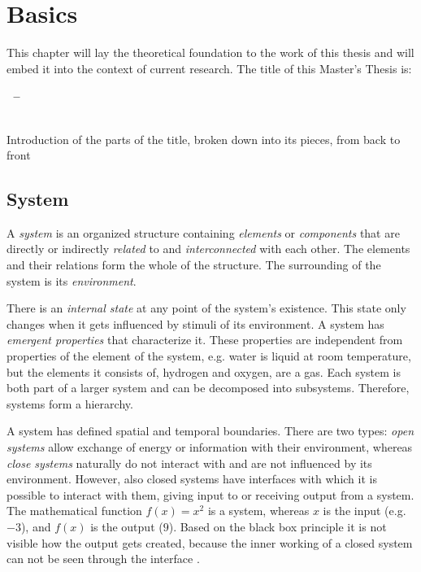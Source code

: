 
\section{Basics}
\label{sec:basics}

This chapter will lay the theoretical foundation to the work of this thesis and will embed it into the context of current research. The title of this Master's Thesis is:

\vspace{-1em}
\begin{center}
\textbf{
	\titleFirst $~$ --\\ [0.2 cm]
	\titleSecond \\
	\titleThird
}
\end{center}

Introduction of the parts of the title, broken down into its pieces, from back to front

\subsection{System} %
\label{sub:system}

A \emph{system} is an organized structure containing \emph{elements} or \emph{components} that are directly or indirectly \emph{related} to and \emph{interconnected} with each other. The elements and their relations form the whole of the structure. The surrounding of the system is its \emph{environment}.

There is an \emph{internal state} at any point of the system's existence. This state only changes when it gets influenced by stimuli of its environment. A system has \emph{emergent properties} that characterize it. These properties are independent from properties of the element of the system, e.g. water is liquid at room temperature, but the elements it consists of, hydrogen and oxygen, are a gas. Each system is both part of a larger system and can be decomposed into subsystems. Therefore, systems form a hierarchy.

A system has defined spatial and temporal boundaries. There are two types: \emph{open systems} allow exchange of energy or information with their environment, whereas \emph{close systems} naturally do not interact with and are not influenced by its environment. However, also closed systems have interfaces with which it is possible to interact with them, giving input to or receiving output from a system. The mathematical function $f(x) = x^2$ is a system, whereas $x$ is the input (e.g. $-3$), and $f(x)$ is the output ($9$). Based on the black box principle it is not visible how the output gets created, because the inner working of a closed system can not be seen through the interface
\cite{system}.

